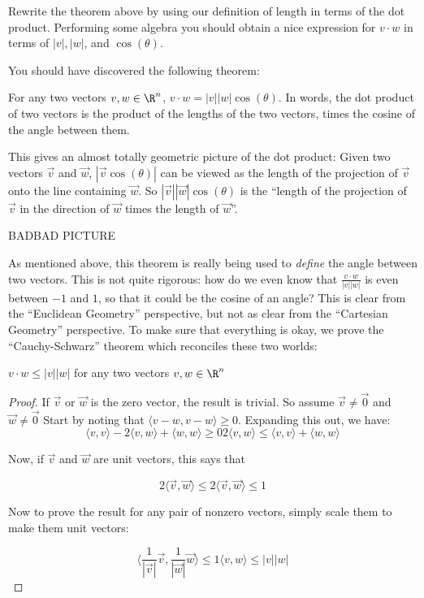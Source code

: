 \begin{question}
	Rewrite the theorem above by using our definition of length in terms of the dot product.  Performing some algebra you should obtain a nice expression for $v\cdot w$
	in terms of $|v|, |w|$, and $\cos(\theta)$.
 \end{question}
 
 You should have discovered the following theorem:
 
 \begin{theorem}
 	For any two vectors $v,w \in \R^n$,  $v \cdot w = |v||w|\cos(\theta)$.  In words, the dot product of two vectors is the product of the lengths of the two vectors,
 	times the cosine of the angle between them.
 \end{theorem}
 
 This gives an almost totally geometric picture of the dot product:  Given two vectors $\vec{v}$ and $\vec{w}$,  $|\vec{v}\cos(\theta)|$ can be viewed as the length of the
 projection of $\vec{v}$ onto the line containing $\vec{w}$.  So $|\vec{v}||\vec{w}|\cos(\theta)$ is the ``length of the projection of $\vec{v}$ in the direction of $\vec{w}$ times the
 length of $\vec{w}$''.
 
 BADBAD PICTURE
 
 As mentioned above, this theorem is really being used to \textit{define} the angle between two vectors.  This is not quite rigorous:  how do we even know that 
 $\frac{v \cdot w}{|v||w|}$ is even between $-1$ and $1$, so that it could be the cosine of an angle?  This is clear from the ``Euclidean Geometry'' perspective, 
 but not as clear from the ``Cartesian Geometry'' perspective.  To make sure that everything is okay, we prove the ``Cauchy-Schwarz'' theorem which reconciles these two
 worlds:
 
 \begin{theorem}
 	$v \cdot w \leq |v||w|$ for any two vectors $v,w \in \R^n$
 \end{theorem} 
 
 \begin{proof}
 	If $\vec{v}$ or $\vec{w}$ is the zero vector, the result is trivial.  So assume $\vec{v} \neq \vec{0}$ and $\vec{w} \neq \vec{0}$
	Start by noting that $\langle v-w,v-w\rangle \geq 0 $.  Expanding this out, we have:
	\[
		\langle v,v \rangle - 2 \langle v,w \rangle +\langle  w,w\rangle \geq 0
		2\langle v,w \rangle \leq \langle v,v \rangle  + \langle w,w\rangle
	\]
	
	Now, if $\vec{v}$ and $\vec{w}$ are unit vectors, this says that
	
	\[
	2\langle \vec{v}, \vec{w} \rangle \leq 2
	\langle \vec{v},\vec{w}\rangle \leq 1
	\]
	
	Now to prove the result for any pair of nonzero vectors, simply scale them to make them unit vectors:
	
	\[
	\langle \frac{1}{|\vec{v}|}\vec{v},\frac{1}{|\vec{w}|}\vec{w}\rangle \leq 1
	\langle v,w\rangle \leq  |v||w|
	\]
 \end{proof}
   
